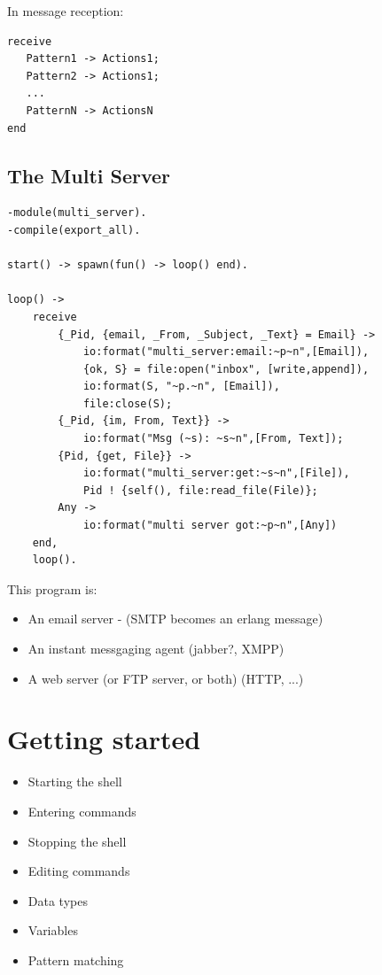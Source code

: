 \documentclass[12pt]{article}
\begin{document}
In message reception:

\begin{verbatim}
receive
   Pattern1 -> Actions1;
   Pattern2 -> Actions1;
   ...
   PatternN -> ActionsN
end
\end{verbatim}

\subsection{The Multi Server}

\begin{verbatim}
-module(multi_server).
-compile(export_all).

start() -> spawn(fun() -> loop() end).

loop() ->
    receive
        {_Pid, {email, _From, _Subject, _Text} = Email} ->
            io:format("multi_server:email:~p~n",[Email]),
            {ok, S} = file:open("inbox", [write,append]),
            io:format(S, "~p.~n", [Email]),
            file:close(S);
        {_Pid, {im, From, Text}} ->
            io:format("Msg (~s): ~s~n",[From, Text]);
        {Pid, {get, File}} ->
            io:format("multi_server:get:~s~n",[File]),
            Pid ! {self(), file:read_file(File)};
        Any ->
            io:format("multi server got:~p~n",[Any])
    end,
    loop().
\end{verbatim}

This program is:

\begin{itemize}
\item An email server - (SMTP becomes an erlang message)
\item An instant messgaging agent (jabber?, XMPP)
\item A web server (or FTP server, or both) (HTTP, ...)
\end{itemize}

\section{Getting started}

\begin{itemize}
\item Starting the shell
\item Entering commands
\item Stopping the shell
\item Editing commands
\item Data types
\item Variables
\item Pattern matching
\end{itemize}
\end{document}
